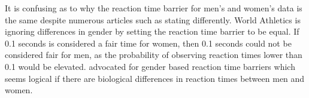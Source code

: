 \documentclass[12pt, letterpaper, titlepage]{article}
\begin{document}
It is confusing as to why the reaction time barrier for men's and women's data
is the same despite numerous articles such as \citep[e.g.,][]{lipps2011implications, 
babicc2009reaction, panoutsakopoulos2020gender} stating differently.  World
Athletics is ignoring differences in gender by setting the reaction time barrier
to be equal. If 0.1 seconds is considered a fair time for women, then 0.1 seconds
could not be considered fair for men, as the probability of observing reaction
times lower than 0.1 would be elevated.  \citet{brosnan2017effects} advocated
for gender based reaction time barriers which seems logical if there are biological
differences in reaction times between men and women.



\end{document}

